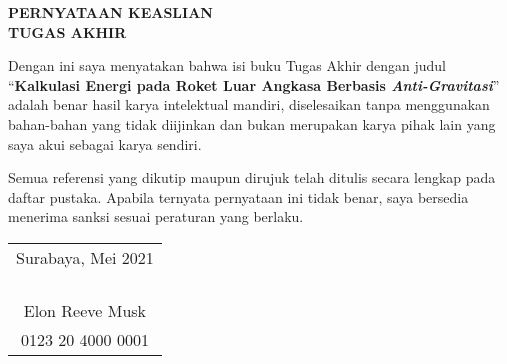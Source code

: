 \begin{center}
  \large\textbf{PERNYATAAN KEASLIAN\\TUGAS AKHIR}
\end{center}

\vspace{2ex}

Dengan ini saya menyatakan bahwa isi buku Tugas Akhir dengan judul
%
``\textbf{Kalkulasi Energi pada Roket Luar Angkasa Berbasis \emph{Anti-Gravitasi}}''
%
adalah benar hasil karya intelektual mandiri, diselesaikan tanpa menggunakan bahan-bahan yang tidak diijinkan dan bukan merupakan karya pihak lain yang saya akui sebagai karya sendiri.

Semua referensi yang dikutip maupun dirujuk telah ditulis secara lengkap pada daftar pustaka.
Apabila ternyata pernyataan ini tidak benar, saya bersedia menerima sanksi sesuai peraturan yang berlaku.

\vspace{4ex}

\begin{flushright}
  \begin{tabular}[b]{c}
    Surabaya, Mei 2021\\
    \\
    \\
    \\
    \\
    Elon Reeve Musk\\
    0123 20 4000 0001
  \end{tabular}
\end{flushright}
